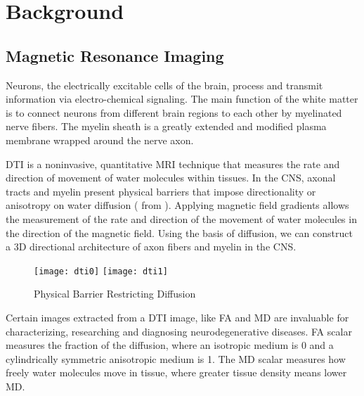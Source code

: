 \section{Background}

\subsection{Magnetic Resonance Imaging}

Neurons, the electrically excitable cells of the brain, process and transmit information via electro-chemical signaling. \cite{brain} The main function of the white matter is to connect neurons from different brain regions to each other by myelinated nerve fibers. \cite{white} The myelin sheath is a greatly extended and modified plasma membrane wrapped around the nerve axon. \cite{myelin}\par
\ac{DTI} is a noninvasive, quantitative \ac{MRI} technique that measures the rate and direction of movement of water molecules within tissues. In the \ac{CNS}, axonal tracts and myelin present physical barriers that impose directionality or anisotropy on water diffusion ( from \cite{dti}). Applying magnetic field gradients allows the measurement of the rate and direction of the movement of water molecules in the direction of the magnetic field. Using the basis of diffusion, we can construct a 3D directional architecture of axon fibers and myelin in the \ac{CNS}. \cite{dti}
\begin{figure}[H]
\centering
\texttt{[image: dti0]}
\texttt{[image: dti1]}
\caption{Physical Barrier Restricting Diffusion}
\label{fig:dti}
\end{figure}
Certain images extracted from a \ac{DTI} image, like \ac{FA} and \ac{MD} are invaluable for characterizing, researching and diagnosing neurodegenerative diseases. \ac{FA} scalar measures the fraction of the diffusion, where an isotropic medium is 0 and a cylindrically symmetric anisotropic medium is 1. The \ac{MD} scalar measures how freely water molecules move in tissue, where greater tissue density means lower \ac{MD}. \cite{rd}\par
